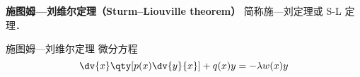 
\begin{issues}
\issueDraft
\end{issues}

\textbf{施图姆—刘维尔定理（Sturm–Liouville theorem）} 简称施—刘定理或 S-L 定理．

\begin{theorem}{施图姆—刘维尔定理}
微分方程
\begin{equation}
\dv{x}\qty[p(x)\dv{y}{x}] + q(x) y = -\lambda w(x) y
\end{equation}
\end{theorem}
